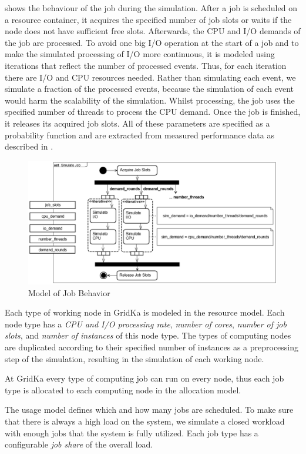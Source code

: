 \documentclass{webofc}
\begin{document}
 shows the behaviour of the job during the simulation. After a job is scheduled on a resource container, it acquires the specified number of job slots or waits if the node does not have sufficient free slots. Afterwards, the CPU and I/O demands of the job are processed. To avoid one big I/O operation at the start of a job and to make the simulated processing of I/O more continuous, it is modeled using iterations that reflect the number of processed events. Thus, for each iteration there are I/O and CPU resources needed. Rather than simulating each event, we simulate a fraction of the processed events, because the simulation of each event would harm the scalability of the simulation. 
Whilst processing, the job uses the specified number of threads to process the CPU demand. Once the job is finished, it releases its acquired job slots. All of these parameters are specified as a probability function and are extracted from measured performance data as described in .


\begin{figure}
	\centering
	\includegraphics[width=0.82\linewidth]{images/seff}
	\caption[]{Model of Job Behavior}
	\label{seff}
\end{figure}

Each type of working node in GridKa is modeled in the resource model. Each node type has a \textit{CPU and I/O processing rate}, \textit{number of cores}, \textit{number of job slots}, and \textit{number of instances} of this node type. The types of computing nodes are duplicated according to their specified number of instances as a preprocessing step of the simulation, resulting in the simulation of each working node.

At GridKa every type of computing job can run on every node, thus each job type is allocated to each computing node in the allocation model.

The usage model defines which and how many jobs are scheduled. To make sure that there is always a high load on the system, we simulate a closed workload with enough jobs that the system is fully utilized. Each job type has a configurable \textit{job share} of the overall load.
\end{document}
